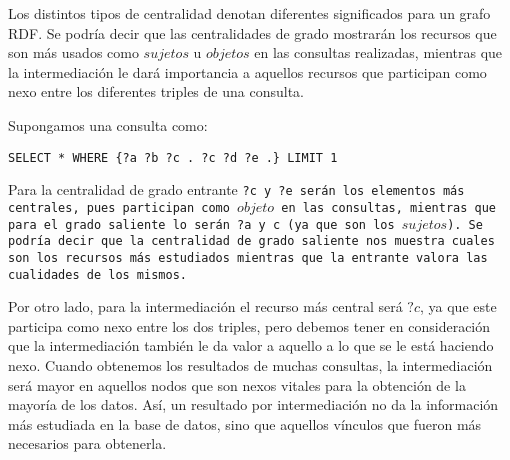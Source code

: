 Los distintos tipos de centralidad denotan diferentes significados para un grafo
RDF.
Se podría decir que las centralidades de grado mostrarán los recursos que son
más usados como $sujetos$ u $objetos$ en las consultas realizadas, mientras que
la intermediación le dará importancia a aquellos recursos que participan como
nexo entre los diferentes triples de una consulta.

Supongamos una consulta como:
\begin{center}
  \tt{SELECT * WHERE \{?a ?b ?c . ?c ?d ?e .\} LIMIT 1}
\end{center}
Para la centralidad de grado entrante \tt{?c} y \tt{?e} serán los elementos más
centrales, pues participan como $objeto$ en las consultas, mientras que para el
grado saliente lo serán \tt{?a} y \tt{c} (ya que son los $sujetos$).
Se podría decir que la centralidad de grado saliente nos muestra cuales son los
recursos más estudiados mientras que la entrante valora las cualidades de los
mismos.

Por otro lado, para la intermediación el recurso más central será $?c$, ya que
este participa como nexo entre los dos triples, pero debemos tener en
consideración que la intermediación también le da valor a aquello a lo que se le
está haciendo nexo.
Cuando obtenemos los resultados de muchas consultas, la intermediación será
mayor en aquellos nodos que son nexos vitales para la obtención de la mayoría de
los datos.
Así, un resultado por intermediación no da la información más estudiada en la
base de datos, sino que aquellos vínculos que fueron más necesarios para
obtenerla.

